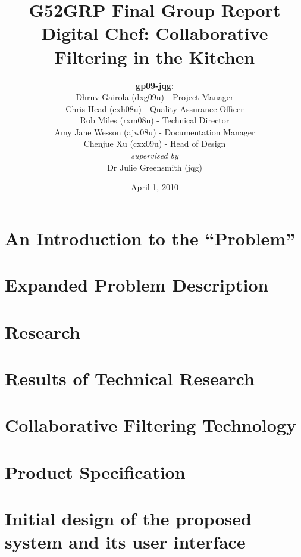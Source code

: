 \documentclass[12pt]{article}
\title{G52GRP Final Group Report \vspace{0.5em}\\
Digital Chef: Collaborative Filtering in the Kitchen}                     %
\author{\textbf{gp09-jqg}: \\
\newline
Dhruv Gairola (dxg09u) - Project Manager\\
Chris Head (cxh08u) - Quality Assurance Officer\\
Rob Miles (rxm08u) - Technical Director\\
Amy Jane Wesson (ajw08u) - Documentation Manager\\
Chenjue Xu (cxx09u) - Head of Design\\
\textit{supervised by} \\
Dr Julie Greensmith (jqg)
} %
\date{April 1, 2010}                                    %
\begin{document}
\maketitle                                              %
\newpage


\tableofcontents%

\newpage

\section{An Introduction to the ``Problem''}

\newpage

\section{Expanded Problem Description}

\newpage

\section{Research} %

\newpage

\section{Results of Technical Research}		%

\newpage

\section{Collaborative Filtering Technology}

\newpage

\section{Product Specification} 			%
\label{sec:productspec}

\newpage

\section{Initial design of the proposed system and its user interface}
\newpage
\end{document}
